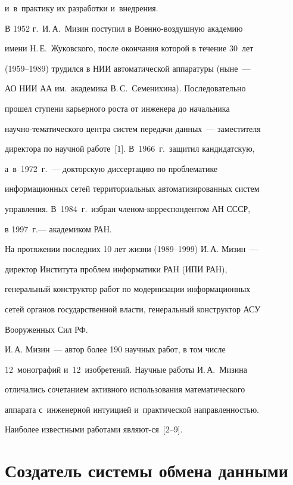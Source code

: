 и~в~практику их разработки и~внедрения. 

   

   В 1952 г.\ И.\,А.~Мизин поступил в Военно-воздушную академию 

имени Н.\,Е.~Жуковского, после окончания которой в течение 30~лет 

(1959--1989) трудился в НИИ автоматической аппаратуры (ныне~--- 

АО НИИ АА им.\ академика В.\,С.~Семенихина). Последовательно 

прошел ступени карьерного роста от инженера до начальника 

научно-тематического центра систем передачи данных~--- заместителя 

директора по научной работе~[1]. В~1966~г.\ защитил кандидатскую, 

а~в~1972~г.~--- докторскую диссертацию по проблематике 

информационных сетей территориальных автоматизированных систем 

управления. В~1984~г.\ избран чле\-ном-кор\-рес\-пон\-ден\-том АН СССР, 

в 1997~г.--- академиком РАН. 

   

   На протяжении последних 10 лет жизни (1989--1999) И.\,А. Мизин~--- 

директор Института проблем информатики РАН (ИПИ РАН), 

генеральный конструктор работ по модернизации информационных 

сетей органов государственной власти, генеральный конструктор АСУ 

Вооруженных Сил РФ.

   

   И.\,А. Мизин~--- автор более 190 научных работ, в том числе 

12~монографий и~12~изобретений. Научные работы И.\,А.~Мизина 

отличались сочетанием активного использования математического 

аппарата с~инженерной интуицией и~практической направленностью. 

Наиболее известными работами являют-\linebreak ся~[2--9]. 



 \vspace*{-6pt}



\section{Создатель системы обмена данными}



